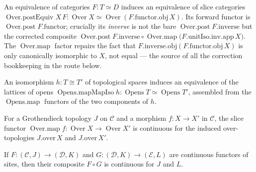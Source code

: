 \begin{lemma}
  \label{mk-lem:over_postEquiv_mathlib}
  \mathlibok

  An equivalence of categories \(F : T \simeq D\) induces an equivalence of slice categories
  \(\operatorname{Over.postEquiv} X\,F : \operatorname{Over} X \simeq \operatorname{Over}
  (F.\mathrm{functor}.\mathrm{obj}\, X)\). Its forward functor is \(\operatorname{Over.post}
  F.\mathrm{functor}\); crucially its \emph{inverse} is not the bare \(\operatorname{Over.post}
  F.\mathrm{inverse}\) but the corrected composite \(\operatorname{Over.post} F.\mathrm{inverse}
  \circ \operatorname{Over.map}\bigl(F.\mathrm{unitIso}.\mathrm{inv}.\mathrm{app}\, X\bigr)\). The
  \(\operatorname{Over.map}\) factor repairs the fact that \(F.\mathrm{inverse}.\mathrm{obj}
  (F.\mathrm{functor}.\mathrm{obj}\, X)\) is only canonically isomorphic to \(X\), not equal --- the
  source of all the correction bookkeeping in the route below.
\end{lemma}

\begin{lemma}
  \label{mk-lem:opens_mapMapIso_mathlib}
  \mathlibok

  An isomorphism \(h : T \cong T'\) of topological spaces induces an equivalence of the lattices of
  opens \(\operatorname{Opens.mapMapIso} h : \operatorname{Opens} T \simeq \operatorname{Opens} T'\),
  assembled from the \(\operatorname{Opens.map}\) functors of the two components of \(h\).
\end{lemma}

\begin{lemma}
  \label{mk-lem:instIsContinuousOverMapOver_mathlib}
  \mathlibok

  For a Grothendieck topology \(J\) on \(\mathcal{C}\) and a morphism \(f : X \to X'\) in
  \(\mathcal{C}\), the slice functor \(\operatorname{Over.map} f : \operatorname{Over} X \to
  \operatorname{Over} X'\) is continuous for the induced over-topologies \(J.\mathrm{over}\,X\) and
  \(J.\mathrm{over}\,X'\).
\end{lemma}

\begin{lemma}
  \label{mk-lem:functor_isContinuous_comp_mathlib}
  \mathlibok

  If \(F : (\mathcal{C}, J) \to (\mathcal{D}, K)\) and \(G : (\mathcal{D}, K) \to (\mathcal{E}, L)\)
  are continuous functors of sites, then their composite \(F \circ G\) is continuous for \(J\) and
  \(L\).
\end{lemma}

